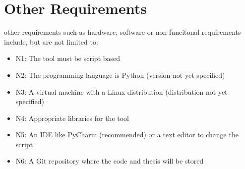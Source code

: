 \section{Other Requirements}
\label{sec:hardware-software}

other requirements such as hardware, software or non-funcitonal requirements include, but are not limited to:

\begin{itemize}
	\item N1\label{sec:n1}: The tool must be script based
	\item N2\label{sec:n2}: The programming language is Python (version not yet specified)
	\item N3\label{sec:n3}: A virtual machine with a Linux distribution (distribution not yet specified)
	\item N4\label{sec:n4}: Appropriate libraries for the tool
	\item N5\label{sec:n5}: An IDE like PyCharm (recommended) or a text editor to change the script
	\item N6\label{sec:n6}: A Git repository where the code and thesis will be stored
\end{itemize}
